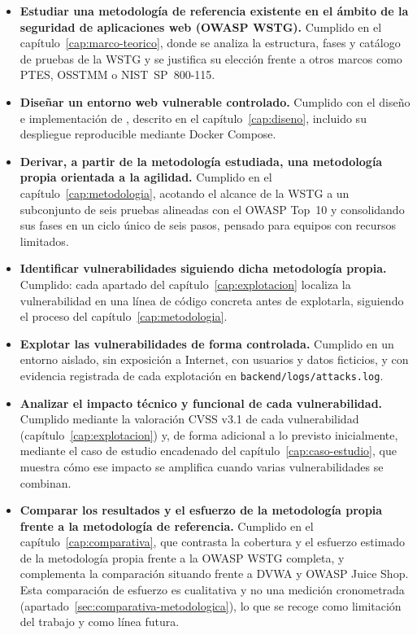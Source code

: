 \begin{itemize}
\item \textbf{Estudiar una metodología de referencia existente en el ámbito
  de la seguridad de aplicaciones web (OWASP WSTG).} Cumplido en el
  capítulo~\ref{cap:marco-teorico}, donde se analiza la estructura, fases y
  catálogo de pruebas de la WSTG y se justifica su elección frente a otros
  marcos como PTES, OSSTMM o NIST~SP~800-115.
\item \textbf{Diseñar un entorno web vulnerable controlado.} Cumplido con el
  diseño e implementación de \breachlab, descrito en el
  capítulo~\ref{cap:diseno}, incluido su despliegue reproducible mediante
  Docker Compose.
\item \textbf{Derivar, a partir de la metodología estudiada, una
  metodología propia orientada a la agilidad.} Cumplido en el
  capítulo~\ref{cap:metodologia}, acotando el alcance de la WSTG a un
  subconjunto de seis pruebas alineadas con el OWASP Top~10 y consolidando
  sus fases en un ciclo único de seis pasos, pensado para equipos con
  recursos limitados.
\item \textbf{Identificar vulnerabilidades siguiendo dicha metodología
  propia.} Cumplido: cada apartado del capítulo~\ref{cap:explotacion}
  localiza la vulnerabilidad en una línea de código concreta antes de
  explotarla, siguiendo el proceso del capítulo~\ref{cap:metodologia}.
\item \textbf{Explotar las vulnerabilidades de forma controlada.} Cumplido
  en un entorno aislado, sin exposición a Internet, con usuarios y datos
  ficticios, y con evidencia registrada de cada explotación en
  \texttt{backend/logs/attacks.log}.
\item \textbf{Analizar el impacto técnico y funcional de cada
  vulnerabilidad.} Cumplido mediante la valoración CVSS v3.1 de cada
  vulnerabilidad (capítulo~\ref{cap:explotacion}) y, de forma adicional a lo
  previsto inicialmente, mediante el caso de estudio encadenado del
  capítulo~\ref{cap:caso-estudio}, que muestra cómo ese impacto se
  amplifica cuando varias vulnerabilidades se combinan.
\item \textbf{Comparar los resultados y el esfuerzo de la metodología
  propia frente a la metodología de referencia.} Cumplido en el
  capítulo~\ref{cap:comparativa}, que contrasta la cobertura y el esfuerzo
  estimado de la metodología propia frente a la OWASP WSTG completa, y
  complementa la comparación situando \breachlab frente a DVWA y OWASP
  Juice Shop. Esta comparación de esfuerzo es cualitativa y no una medición
  cronometrada (apartado~\ref{sec:comparativa-metodologica}), lo que se
  recoge como limitación del trabajo y como línea futura.
\end{itemize}

